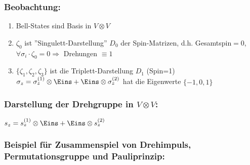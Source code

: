 \documentclass[twoside,a4paper]{scrartcl}
\renewcommand{\1}{\mathds{1}}
\newcommand{\Ra}{\Rightarrow}
\begin{document}
\subsubsection*{Beobachtung:}
\begin{enumerate}
\item Bell-States sind Basis in $V\otimes V$
\item $\zeta_0$ ist ''Singulett-Darstellung'' $D_0$ der Spin-Matrizen, d.h. Gesamtspin$=0$, $\forall \sigma_i \cdot \zeta_0=0 \Ra $ Drehungen $\equiv 1$
\item $\{\zeta_1, \zeta_2, \zeta_3\}$ ist die Triplett-Darstellung $D_1$ (Spin=1)\\
$\sigma_z=\sigma_z^{(1)}\otimes \Eins+\Eins\otimes \sigma_z^{(2)}$ hat die Eigenwerte $\{-1,0,1\}$
\end{enumerate}
\subsubsection*{Darstellung der Drehgruppe in $V\otimes V$:}
$s_z=s_z^{(1)}\otimes \Eins+\Eins\otimes s_z^{(2)}$

\subsubsection*{Beispiel für Zusammenspiel von Drehimpuls, Permutationsgruppe und Pauliprinzip:}
\end{document}
